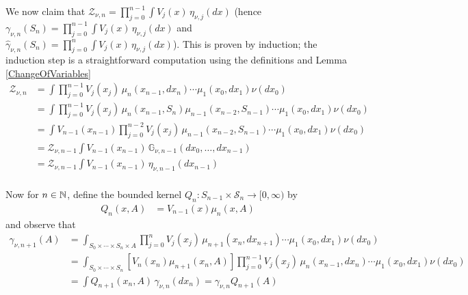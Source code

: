 We now claim that $\mathcal{Z}_{\nu,n} = \prod_{j=0}^{n-1} \int V_j(x) \, \eta_{\nu, j}(dx)$ (hence $\gamma_{\nu,n}(S_n) = \prod_{j=0}^{n-1} \int V_j(x) \, \eta_{\nu, j}(dx)$ and $\hat{\gamma}_{\nu,n}(S_n) = \prod_{j=0}^{n} \int V_j(x) \, \eta_{\nu, j}(dx)$).
This is proven by induction; the induction step is a straightforward computation using the definitions and Lemma \ref{ChangeOfVariables}
\begin{align*}
\mathcal{Z}_{\nu,n} &= \int \prod_{j=0}^{n-1} V_j(x_j) \, \mu_n(x_{n-1}, dx_n) \dotsb \mu_1(x_0, dx_1) \nu(dx_0) \\
&= \int \prod_{j=0}^{n-1} V_j(x_j) \, \mu_n(x_{n-1}, S_n) \mu_{n-1}(x_{n-2}, S_{n-1})\dotsb \mu_1(x_0, dx_1) \nu(dx_0) \\
&= \int V_{n-1}(x_{n-1}) \prod_{j=0}^{n-2} V_j(x_j) \, \mu_{n-1}(x_{n-2}, S_{n-1})\dotsb \mu_1(x_0, dx_1) \nu(dx_0) \\
&= \mathcal{Z}_{\nu, n-1} \int V_{n-1}(x_{n-1}) \, \mathds{G}_{\nu, n-1}(dx_0, \dotsc, dx_{n-1})\\
&= \mathcal{Z}_{\nu, n-1} \int V_{n-1}(x_{n-1}) \, \eta_{\nu, n-1}(dx_{n-1})\\
\end{align*}


Now for $n \in \mathbb{N}$, define the bounded kernel $Q_n : S_{n-1} \times \mathcal{S}_{n} \to [0,\infty)$ by
\begin{align*}
Q_{n}(x,A) &= V_{n-1}(x) \mu_{n}(x,A)
\end{align*} 
and observe that 
\begin{align*}
\gamma_{\nu, n+1}(A) &= \int_{S_0 \times \dotsb \times S_{n} \times A} \prod_{j=0}^{n} V_j(x_j) \, \mu_{n+1} (x_{n}, dx_{n+1}) \dotsb \mu_1(x_0,dx_1) \nu(dx_0) \\
&= \int_{S_0 \times \dotsb \times S_{n} } \left [V_n(x_n) \mu_{n+1} (x_{n},A) \right ] \prod_{j=0}^{n-1} V_j(x_j) \, \mu_{n} (x_{n-1}, dx_{n})  \dotsb \mu_1(x_0,dx_1) \nu(dx_0) \\
&= \int Q_{n+1} (x_{n},A) \, \gamma_{\nu, n}(dx_{n}) = \gamma_{\nu, n} Q_{n+1} (A)
\end{align*}